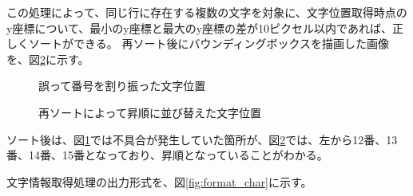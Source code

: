 この処理によって、同じ行に存在する複数の文字を対象に、文字位置取得時点のy座標について、最小のy座標と最大のy座標の差が10ピクセル以内であれば、正しくソートができる。
再ソート後にバウンディングボックスを描画した画像を、図\ref{fig:after_sorted_string}に示す。
\begin{figure}[tp]
    \begin{center}
        \caption{誤って番号を割り振った文字位置}
        \label{fig:before_sorted_string}
    \end{center}
\end{figure}
\begin{figure}[tp]
    \begin{center}
        \caption{再ソートによって昇順に並び替えた文字位置}
        \label{fig:after_sorted_string}
    \end{center}
\end{figure}
ソート後は、図\ref{fig:before_sorted_string}では不具合が発生していた箇所が、図\ref{fig:after_sorted_string}では、左から12番、13番、14番、15番となっており、昇順となっていることがわかる。

文字情報取得処理の出力形式を、図\ref{fig:format_char}に示す。

